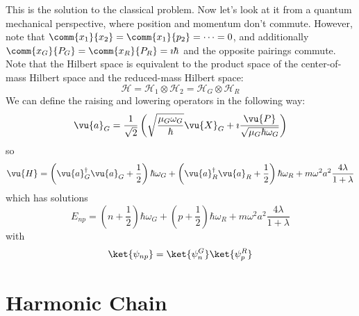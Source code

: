 \documentclass[a4paper,twoside,master.tex]{subfiles}
\begin{document}
This is the solution to the classical problem. Now let's look at it from a quantum mechanical perspective, where position and momentum don't commute. However, note that $ \comm{x_1}{x_2} = \comm{x_1}{p_2} = \cdots = 0 $, and additionally $ \comm{x_G}{P_G} = \comm{x_R}{P_R} = \imath \hbar $ and the opposite pairings commute. Note that the Hilbert space is equivalent to the product space of the center-of-mass Hilbert space and the reduced-mass Hilbert space:
\begin{equation}
    \mathcal{H} = \mathcal{H}_1 \otimes \mathcal{H}_2 = \mathcal{H}_G \otimes \mathcal{H}_R
\end{equation}
We can define the raising and lowering operators in the following way:
\begin{equation}
    \vu{a}_G = \frac{1}{\sqrt{2}} \left( \sqrt{\frac{\mu_G \omega_G}{\hbar}} \vu{X}_G + \imath \frac{ \vu{P}}{\sqrt{\mu_G \hbar \omega_G}} \right)
\end{equation}
so
\begin{equation}
    \vu{H} = \left( \vu{a}_G^\dagger \vu{a}_G + \frac{1}{2} \right) \hbar \omega_G + \left( \vu{a}_R^\dagger \vu{a}_R + \frac{1}{2} \right) \hbar \omega_R + m \omega^2 a^2 \frac{4 \lambda}{1 + \lambda}
\end{equation}
which has solutions
\begin{equation}
    E_{np} = \left( n + \frac{1}{2} \right) \hbar \omega_G + \left( p + \frac{1}{2} \right) \hbar \omega_R + m \omega^2 a^2 \frac{4 \lambda}{1 + \lambda}
\end{equation}
with
\begin{equation}
    \ket{\psi_{np}} =\ket{\psi_n^G}\ket{\psi_p^R}
\end{equation}

\section{Harmonic Chain}
\label{sec:harmonic_chain}
\end{document}
